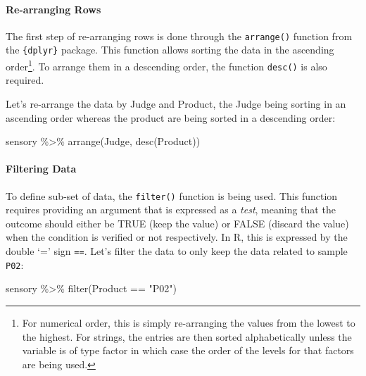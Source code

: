 \documentclass[
]{book}
\newenvironment{Shaded}{\begin{snugshade}}{\end{snugshade}}
\newcommand{\FunctionTok}[1]{\textcolor[rgb]{0.00,0.00,0.00}{#1}}
\newcommand{\NormalTok}[1]{#1}
\newcommand{\SpecialCharTok}[1]{\textcolor[rgb]{0.00,0.00,0.00}{#1}}
\newcommand{\StringTok}[1]{\textcolor[rgb]{0.31,0.60,0.02}{#1}}
\begin{document}
\hypertarget{re-arranging-rows}{%
\paragraph{Re-arranging Rows}\label{re-arranging-rows}}

The first step of re-arranging rows is done through the \texttt{arrange()} function from the \texttt{\{dplyr\}} package. This function allows sorting the data in the ascending order\footnote{For numerical order, this is simply re-arranging the values from the lowest to the highest. For strings, the entries are then sorted alphabetically unless the variable is of type factor in which case the order of the levels for that factors are being used.}. To arrange them in a descending order, the function \texttt{desc()} is also required.

Let's re-arrange the data by Judge and Product, the Judge being sorting in an ascending order whereas the product are being sorted in a descending order:

\begin{Shaded}
\begin{Highlighting}[]
\NormalTok{sensory }\SpecialCharTok{\%\textgreater{}\%} 
  \FunctionTok{arrange}\NormalTok{(Judge, }\FunctionTok{desc}\NormalTok{(Product))}
\end{Highlighting}
\end{Shaded}

\hypertarget{filtering-data}{%
\paragraph{Filtering Data}\label{filtering-data}}

To define sub-set of data, the \texttt{filter()} function is being used. This function requires providing an argument that is expressed as a \emph{test}, meaning that the outcome should either be TRUE (keep the value) or FALSE (discard the value) when the condition is verified or not respectively. In R, this is expressed by the double `=' sign \texttt{==}. Let's filter the data to only keep the data related to sample \texttt{P02}:

\begin{Shaded}
\begin{Highlighting}[]
\NormalTok{sensory }\SpecialCharTok{\%\textgreater{}\%} 
  \FunctionTok{filter}\NormalTok{(Product }\SpecialCharTok{==} \StringTok{"P02"}\NormalTok{)}
\end{Highlighting}
\end{Shaded}
\end{document}

